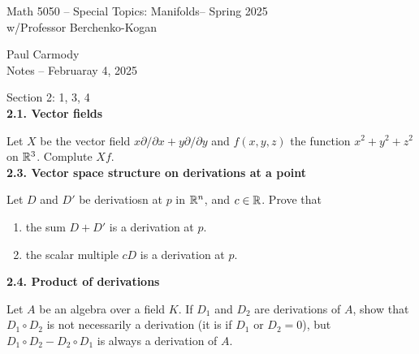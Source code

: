 \documentclass[10pt,a4paper]{report}
\newcommand{\CLASSNAME}{Math 5050 -- Special Topics: Manifolds}
\newcommand{\STUDENTNAME}{Paul Carmody}
\newcommand{\ASSIGNMENT}{Notes }
\newcommand{\DUEDATE}{Februaray 4, 2025}
\newcommand{\SEMESTER}{Spring 2025}
\begin{document}
\begin{center}
	\Large{\CLASSNAME -- \SEMESTER} \\
	\large{ w/Professor Berchenko-Kogan}
\end{center}
\begin{center}
	\STUDENTNAME \\
	\ASSIGNMENT -- \DUEDATE\\
\end{center} 

\noindent Section 2: 1, 3, 4\\

\noindent \textbf{2.1. Vector fields}

\noindent Let $X$ be the vector field $x\partial/\partial x + y\partial/\partial y$ and $f(x,y,z)$ the function $x^2+y^2+z^2$ on $\mathbb{R}^3$.  Complute $Xf$.\\

\noindent \textbf{2.3. Vector space structure on derivations at a point}

\noindent Let $D$ and $D'$ be derivatiosn at $p$ in $\mathbb{R}^n$, and $c \in \mathbb{R}$.  Prove that
\begin{enumerate}[label=(\alph*)]
	\item the sum $D+D'$ is a derivation at $p$.
	\item the scalar multiple $cD$ is a derivation at $p$.
\end{enumerate}

\noindent \textbf{2.4. Product of derivations}

\noindent Let $A$ be an algebra over a field $K$.  If $D_1$ and $D_2$ are derivations of $A$, show that $D_1 \circ D_2$ is not necessarily a derivation (it is if $D_1$ or $D_2=0$), but $D_1\circ D_2 - D_2\circ D_1$ is always a derivation of $A$.
\end{document}

